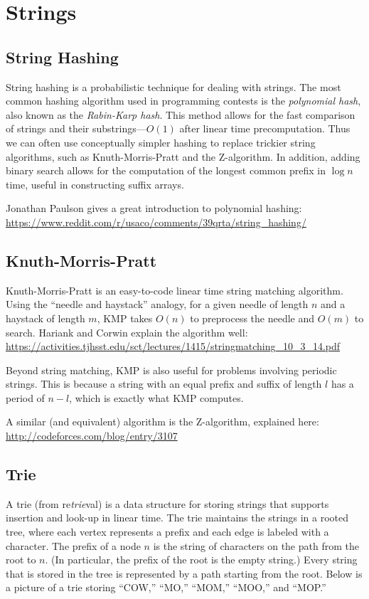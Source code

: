 \chapter{Strings}

\section{String Hashing}

String hashing is a probabilistic technique for dealing with strings. The most common hashing algorithm used in programming contests is the \emph{polynomial hash}, also known as the \emph{Rabin-Karp hash}. This method allows for the fast comparison of strings and their substrings---$O(1)$ after linear time precomputation. Thus we can often use conceptually simpler hashing to replace trickier string algorithms, such as Knuth-Morris-Pratt and the Z-algorithm. In addition, adding binary search allows for the computation of the longest common prefix in $\log n$ time, useful in constructing suffix arrays.

Jonathan Paulson gives a great introduction to polynomial hashing: \url{https://www.reddit.com/r/usaco/comments/39qrta/string_hashing/}

\section{Knuth-Morris-Pratt}

Knuth-Morris-Pratt is an easy-to-code linear time string matching algorithm. Using the ``needle and haystack'' analogy, for a given needle of length $n$ and a haystack of length $m$, KMP takes $O(n)$ to preprocess the needle and $O(m)$ to search. Hariank and Corwin explain the algorithm well: \url{https://activities.tjhsst.edu/sct/lectures/1415/stringmatching_10_3_14.pdf}

Beyond string matching, KMP is also useful for problems involving periodic strings. This is because a string with an equal prefix and suffix of length $l$ has a period of $n - l$, which is exactly what KMP computes.

A similar (and equivalent) algorithm is the Z-algorithm, explained here: \url{http://codeforces.com/blog/entry/3107}

\section{Trie}

A trie (from re\emph{trie}val) is a data structure for storing strings that supports insertion and look-up in linear time. The trie maintains the strings in a rooted tree, where each vertex represents a prefix and each edge is labeled with a character. The prefix of a node $n$ is the string of characters on the path from the root to $n$. (In particular, the prefix of the root is the empty string.) Every string that is stored in the tree is represented by a path starting from the root. Below is a picture of a trie storing ``COW,'' ``MO,'' ``MOM,'' ``MOO,'' and ``MOP.''

